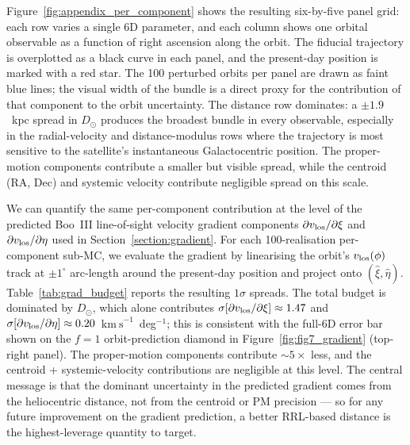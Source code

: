\documentclass[twocolumn]{aastex631}
\newcommand{\vlosUnits}{$\mathrm{km~s}^{-1}$\xspace}
\begin{document}
Figure~\ref{fig:appendix_per_component} shows the resulting six-by-five panel grid: each row varies a single 6D parameter, and each column shows one orbital observable as a function of right ascension along the orbit. The fiducial trajectory is overplotted as a black curve in each panel, and the present-day position is marked with a red star. The 100 perturbed orbits per panel are drawn as faint blue lines; the visual width of the bundle is a direct proxy for the contribution of that component to the orbit uncertainty. The distance row dominates: a $\pm 1.9$~kpc spread in $D_\odot$ produces the broadest bundle in every observable, especially in the radial-velocity and distance-modulus rows where the trajectory is most sensitive to the satellite's instantaneous Galactocentric position. The proper-motion components contribute a smaller but visible spread, while the centroid (RA, Dec) and systemic velocity contribute negligible spread on this scale.

We can quantify the same per-component contribution at the level of the predicted Boo~III line-of-sight velocity gradient components $\partial v_{\rm los}/\partial\xi$ and $\partial v_{\rm los}/\partial\eta$ used in Section~\ref{section:gradient}. For each 100-realisation per-component sub-MC, we evaluate the gradient by linearising the orbit's $v_{\rm los}(\phi)$ track at $\pm 1^\circ$ arc-length around the present-day position and project onto $(\hat\xi, \hat\eta)$. Table~\ref{tab:grad_budget} reports the resulting $1\sigma$ spreads. The total budget is dominated by $D_\odot$, which alone contributes $\sigma[\partial v_{\rm los}/\partial\xi] \approx 1.47$ and $\sigma[\partial v_{\rm los}/\partial\eta] \approx 0.20$~\vlosUnits~deg$^{-1}$; this is consistent with the full-6D error bar shown on the $f=1$ orbit-prediction diamond in Figure~\ref{fig:fig7_gradient} (top-right panel). The proper-motion components contribute $\sim 5\times$ less, and the centroid + systemic-velocity contributions are negligible at this level. The central message is that the dominant uncertainty in the predicted gradient comes from the heliocentric distance, not from the centroid or PM precision --- so for any future improvement on the gradient prediction, a better RRL-based distance is the highest-leverage quantity to target.




{}

\end{document}
